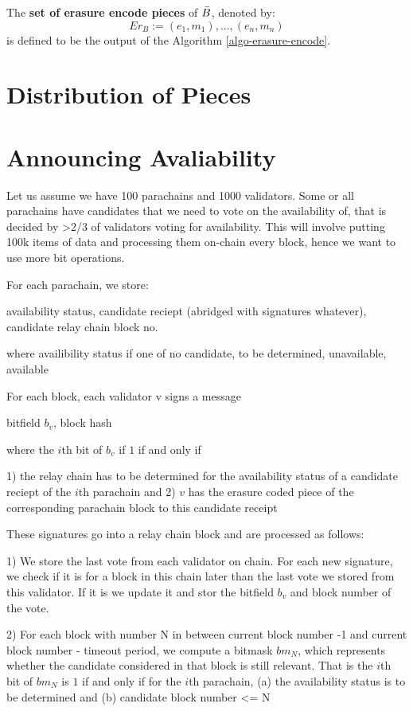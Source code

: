 \begin{definition}
  \label{defn-erauser-coded-pieces} 
  The {\bf set of erasure encode pieces} of $\bar{B}$, denoted by: 
  \[
   Er_B := {(e_1, m_1),...,(e_n,m_n)}
   \]
   is defined to be the output of the Algorithm \ref{algo-erasure-encode}.
\end{definition}

\section{Distribution of Pieces}\label{distribute-piece}

\section{Announcing Avaliability}\label{voting}

Let us assume we have 100 parachains and 1000 validators. Some or all parachains have candidates that we need to vote on the availability of, that is decided by >2/3 of validators voting for availability. This will involve putting 100k items of data and processing them on-chain every block, hence we want to use more bit operations.

For each parachain, we store:

availability status, candidate reciept (abridged with signatures whatever), candidate relay chain block no.

where availibility status if one of {no candidate, to be determined, unavailable, available}

For each block, each validator v signs a message

bitfield $b_v$, block hash

where the $i$th bit of $b_v$ if $1$ if and only if 

1) the relay chain has to be determined for the availability status of a candidate reciept of the $i$th parachain and 
2) $v$ has the erasure coded piece of the corresponding parachain block to this candidate receipt

These signatures go into a relay chain block and are processed as follows:

1) We store the last vote from each validator on chain. For each new signature, we check if it is for a block in this chain later than the last vote we stored from this validator. If it is we update it and stor the bitfield $b_v$ and block number of the vote.

2) For each block with number N in between current block number -1 and current block number - timeout period, we compute a bitmask $bm_N$, which represents whether the candidate considered in that block is still relevant. That is the $i$th bit of $bm_N$ is $1$ if and only if for the $i$th parachain, 
    (a) the availability status is to be determined and
    (b) candidate block number <= N
    
